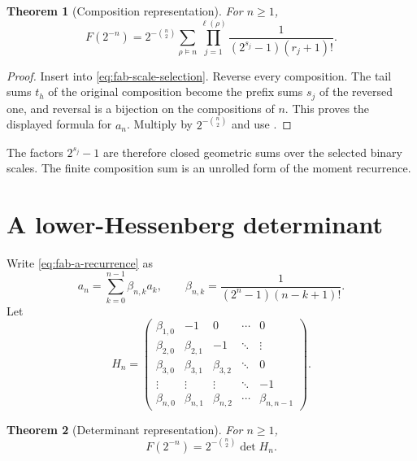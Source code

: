 \documentclass[11pt,oneside,openany]{book}
\newtheorem{theorem}{Theorem}[chapter]
\theoremstyle{definition}
\theoremstyle{remark}
\begin{document}
\begin{theorem}[Composition representation]\label{thm:fab-composition}
For $n\ge1$,
\begin{equation}
 \boxed{
 F(2^{-n})=2^{-\binom n2}
 \sum_{\rho\vDash n}
 \prod_{j=1}^{\ell(\rho)}
 \frac1{(2^{s_j}-1)(r_j+1)!}.}
 \label{eq:fab-composition}
\end{equation}
\end{theorem}

\begin{proof}
Insert  into \eqref{eq:fab-scale-selection}.  Reverse every composition.  The tail sums $t_h$ of the original composition become the prefix sums $s_j$ of the reversed one, and reversal is a bijection on the compositions of $n$.  This proves the displayed formula for $a_n$.  Multiply by $2^{-\binom n2}$ and use .
\end{proof}

The factors $2^{s_j}-1$ are therefore closed geometric sums over the selected binary scales.  The finite composition sum is an unrolled form of the moment recurrence.

\section{A lower-Hessenberg determinant}

Write \eqref{eq:fab-a-recurrence} as
\begin{equation}
 a_n=\sum_{k=0}^{n-1}\beta_{n,k}a_k,
 \qquad
 \beta_{n,k}=\frac1{(2^n-1)(n-k+1)!}.
 \label{eq:fab-beta-recurrence}
\end{equation}
Let
\begin{equation}
 H_n=
 \begin{pmatrix}
 \beta_{1,0}&-1&0&\cdots&0\\
 \beta_{2,0}&\beta_{2,1}&-1&\ddots&\vdots\\
 \beta_{3,0}&\beta_{3,1}&\beta_{3,2}&\ddots&0\\
 \vdots&\vdots&\vdots&\ddots&-1\\
 \beta_{n,0}&\beta_{n,1}&\beta_{n,2}&\cdots&\beta_{n,n-1}
 \end{pmatrix}.
 \label{eq:fab-Hn}
\end{equation}

\begin{theorem}[Determinant representation]\label{thm:fab-determinant}
For $n\ge1$,
\begin{equation}
 \boxed{F(2^{-n})=2^{-\binom n2}\det H_n.}
 \label{eq:fab-determinant}
\end{equation}
\end{theorem}
\end{document}
